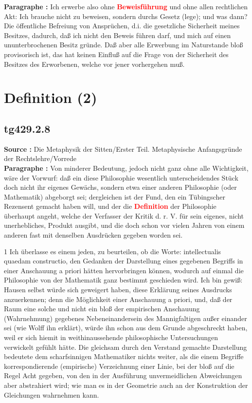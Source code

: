\documentclass[a4paper,12pt,twoside]{book}
\newcommand{\match}[1]{\textcolor{red}{\textbf{#1}}}
\newcommand{\unnumberedsection}[1]{
	\section*{#1}
	\addcontentsline{toc}{section}{#1}
	\markright{#1}
}
\begin{document}
	\textbf{Paragraphe : }Ich erwerbe also ohne \match{Beweisführung} und ohne allen rechtlichen Akt: Ich brauche nicht zu beweisen, sondern durchs Gesetz (lege); und was dann? Die öffentliche Befreiung von Ansprüchen, d.i. die gesetzliche Sicherheit meines Besitzes, dadurch, daß ich nicht den Beweis führen darf, und mich auf einen ununterbrochenen Besitz gründe. Daß aber alle Erwerbung im Naturstande bloß provisorisch ist, das hat keinen Einfluß auf die Frage von der Sicherheit des Besitzes des Erworbenen, welche vor jener vorhergehen muß. 
	
	\unnumberedsection{Definition (2)} 
	\subsection*{tg429.2.8} 
	\textbf{Source : }Die Metaphysik der Sitten/Erster Teil. Metaphysische Anfangsgründe der Rechtslehre/Vorrede\\  
	
	\textbf{Paragraphe : }
	Von minderer Bedeutung, jedoch nicht ganz ohne alle Wichtigkeit, wäre der Vorwurf: daß ein diese Philosophie wesentlich unterscheidendes Stück doch nicht ihr eigenes Gewächs, sondern etwa einer anderen Philosophie (oder Mathematik) abgeborgt sei; dergleichen ist der Fund, den ein Tübingscher Rezensent gemacht haben will, und der die \match{Definition} der Philosophie überhaupt angeht, welche der Verfasser der Kritik d. r. V. für sein eigenes, nicht unerhebliches, Produkt ausgibt, und die doch schon vor vielen Jahren von einem anderen fast mit denselben Ausdrücken gegeben worden sei.
	
	
	1
	Ich überlasse es einem jeden, zu beurteilen, ob die Worte: intellectualis quaedam constructio, den Gedanken der Darstellung eines gegebenen Begriffs in einer Anschauung a priori hätten hervorbringen können, wodurch auf einmal die Philosophie von der Mathematik ganz bestimmt geschieden wird. Ich bin gewiß: Hausen selbst würde sich geweigert haben, diese Erklärung seines Ausdrucks anzuerkennen; denn die Möglichkeit einer Anschauung a priori, und, daß der Raum eine solche und nicht ein bloß der empirischen Anschauung (Wahrnehmung) gegebenes Nebeneinandersein des Mannigfaltigen außer einander sei (wie Wolff ihn erklärt), würde ihn schon aus dem Grunde abgeschreckt haben, weil er sich hiemit in weithinaussehende philosophische Untersuchungen verwickelt gefühlt hätte. Die gleichsam durch den Verstand gemachte Darstellung bedeutete dem scharfsinnigen Mathematiker nichts weiter, als die einem Begriffe korrespondierende (empirische) Verzeichnung einer Linie, bei der bloß auf die Regel Acht gegeben, von den in der Ausführung unvermeidlichen Abweichungen  aber abstrahiert wird; wie man es in der Geometrie auch an der Konstruktion der Gleichungen wahrnehmen kann. 
	
\end{document}
